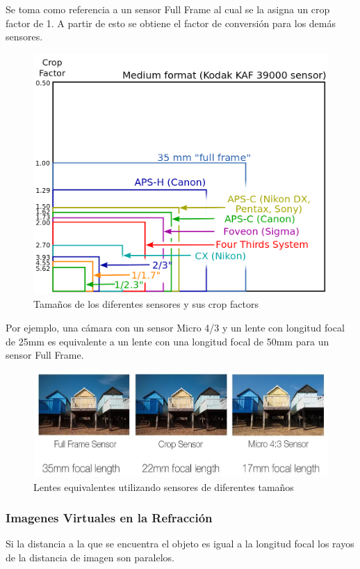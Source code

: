 \documentclass{article}
\begin{document}
Se toma como referencia a un sensor Full Frame al cual se la asigna un crop factor de 1. A partir de esto se obtiene el factor de conversión para los demás sensores.

\begin{figure}[H]
	\centering
	\includegraphics[width=0.65\linewidth]{Figuras/Sensor_Sizes}
	\caption{Tamaños de los diferentes sensores y sus crop factors}
	\label{fig:sensorsizes}
\end{figure}

Por ejemplo, una cámara con un sensor Micro 4/3 y un lente con longitud focal de 25mm es equivalente a un lente con una longitud focal de 50mm para un sensor Full Frame.

\begin{figure}[H]
	\centering
	\includegraphics[width=0.75\linewidth]{Figuras/Crop_Factor_Focal_Length_Equivalent}
	\caption{Lentes equivalentes utilizando sensores de diferentes tamaños}
	\label{fig:cropfactorfocallengthequivalent}
\end{figure}


\subsubsection{Imagenes Virtuales en la Refracción}

Si la distancia a la que se encuentra el objeto es igual a la longitud focal los rayos de la distancia de imagen son paralelos.
\end{document}
